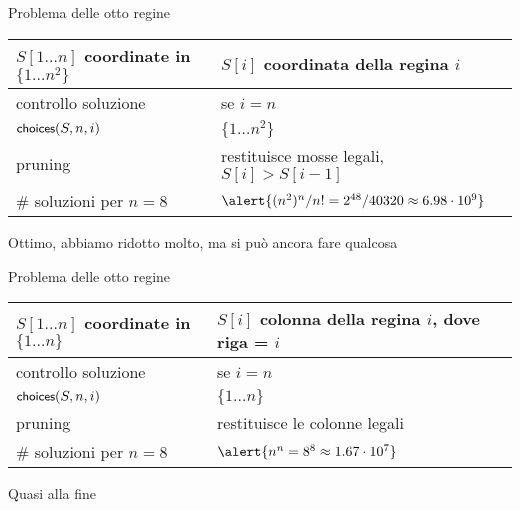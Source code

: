 \begin{frame}{Problema delle otto regine}

\vspace{-9pt}

\medskip
\begin{tabular}{|P{4cm}|P{7.1cm}|}
\hline
$S[1 \ldots n]$ coordinate in $\{ 1 \ldots n^2 \}$	&	$S[i]$ coordinata della regina $i$ \\\hline
controllo soluzione	& se $i = n$ \\\hline
$\textsf{{\small choices}}(S, n, i)$	&	$\{ 1 \ldots n^2 \}$ \\\hline
pruning	&	restituisce mosse legali, \alert{\small $S[i] > S[i-1]$} \\\hline
\# soluzioni per $n=8$ 	&		$\alert{(n^2)^n/n! = 2^{48}/40320 \approx 6.98 \cdot 10^{9}}$\\\hline 
\end{tabular}

\begin{myboxtitle}[Commenti]
\BI
\item Ottimo, abbiamo ridotto molto, ma si può ancora fare qualcosa
\EI
\end{myboxtitle}

\end{frame}


\begin{frame}{Problema delle otto regine}

\vspace{-9pt}

\medskip
\begin{tabular}{|P{4cm}|P{7.1cm}|}
\hline
$S[1 \ldots n]$ coordinate in $\{ 1 \ldots n \}$	&	$S[i]$ colonna della regina $i$, dove riga = $i$ \\\hline
controllo soluzione	& se $i = n$ \\\hline
$\textsf{{\small choices}}(S, n, i)$	&	$\{ 1 \ldots n \}$ \\\hline
pruning	&	restituisce le colonne legali \\\hline
\# soluzioni per $n=8$ 	&		$\alert{n^n = 8^{8} \approx 1.67 \cdot 10^{7}}$\\\hline 
\end{tabular}

\begin{myboxtitle}[Commenti]
\BI
\item Quasi alla fine
\EI
\end{myboxtitle}

\end{frame}

